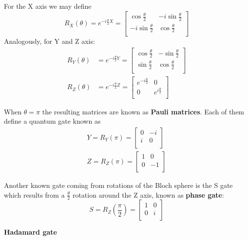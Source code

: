 For the X axis we may define 
$$R_{X}(\theta)=e^{-i\frac{\theta}{2}X} = \begin{bmatrix}
        \cos \frac{\theta}{2}& -i \sin \frac{\theta}{2}\\
        -i \sin \frac{\theta}{2}& \cos \frac{\theta}{2}\\
        \end{bmatrix}$$
Analogously, for Y and Z axis:
\begin{align}
    R_{Y}(\theta)&=e^{-i\frac{\theta}{2}Y} = \begin{bmatrix}
        \cos \frac{\theta}{2}& - \sin \frac{\theta}{2}\\
        \sin \frac{\theta}{2}& \cos \frac{\theta}{2}\\
        \end{bmatrix}\\
    R_{Z}(\theta)&=e^{-i\frac{\theta}{2}Z} = \begin{bmatrix}
        e^{-i \frac{\theta}{2}}& 0\\
        0& e^{i \frac{\theta}{2}}\\
        \end{bmatrix}   
\end{align}

When $\theta=\pi$ the resulting matrices are known as \textbf{Pauli matrices}. Each of them define a quantum gate known as 
\begin{align}
    Y = R_{Y}(\pi)= \begin{bmatrix}
        0&-i\\
        i&0\\
        \end{bmatrix} \\
    Z = R_{Z}(\pi) = \begin{bmatrix}
        1&0\\
        0&-1\\
        \end{bmatrix} 
\end{align}

Another known gate coming from rotations of the Bloch sphere is the S gate which results from a $\frac{\theta}{2}$ rotation around the Z axis, known as \textbf{phase gate}:
$$ S = R_{Z}(\frac{\pi}{2})= \begin{bmatrix}
        1&0\\
        0&i\\
        \end{bmatrix} $$

\textbf{Hadamard gate}

